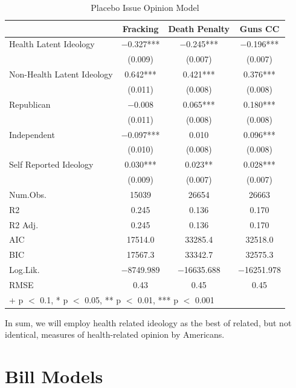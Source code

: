 \documentclass[
  oneside]{book}
\begin{document}
\begin{table}

\caption{\label{tab:unnamed-chunk-25}Placebo Issue Opinion Model}
\centering
\begin{tabular}[t]{lccc}
\toprule
  & Fracking & Death Penalty & Guns CC\\
\midrule
Health Latent Ideology & \num{-0.327}*** & \num{-0.245}*** & \num{-0.196}***\\
 & (\num{0.009}) & (\num{0.007}) & \vphantom{1} (\num{0.007})\\
Non-Health Latent Ideology & \num{0.642}*** & \num{0.421}*** & \num{0.376}***\\
 & (\num{0.011}) & (\num{0.008}) & \vphantom{1} (\num{0.008})\\
Republican & \num{-0.008} & \num{0.065}*** & \num{0.180}***\\
 & (\num{0.011}) & (\num{0.008}) & (\num{0.008})\\
Independent & \num{-0.097}*** & \num{0.010} & \num{0.096}***\\
 & (\num{0.010}) & (\num{0.008}) & (\num{0.008})\\
Self Reported Ideology & \num{0.030}*** & \num{0.023}** & \num{0.028}***\\
 & (\num{0.009}) & (\num{0.007}) & (\num{0.007})\\
\midrule
Num.Obs. & \num{15039} & \num{26654} & \num{26663}\\
R2 & \num{0.245} & \num{0.136} & \num{0.170}\\
R2 Adj. & \num{0.245} & \num{0.136} & \num{0.170}\\
AIC & \num{17514.0} & \num{33285.4} & \num{32518.0}\\
BIC & \num{17567.3} & \num{33342.7} & \num{32575.3}\\
Log.Lik. & \num{-8749.989} & \num{-16635.688} & \num{-16251.978}\\
RMSE & \num{0.43} & \num{0.45} & \num{0.45}\\
\bottomrule
\multicolumn{4}{l}{\rule{0pt}{1em}+ p $<$ 0.1, * p $<$ 0.05, ** p $<$ 0.01, *** p $<$ 0.001}\\
\end{tabular}
\end{table}

In sum, we will employ health related ideology as the best of related, but not identical, measures of health-related opinion by Americans.

\hypertarget{bill-models}{%
\chapter{Bill Models}\label{bill-models}}
\end{document}
